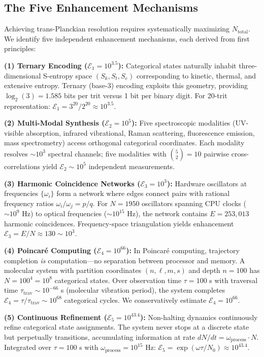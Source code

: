 \documentclass[twocolumn,10pt]{article}
\theoremstyle{remark}
\begin{document}
\subsection{The Five Enhancement Mechanisms}

Achieving trans-Planckian resolution requires systematically maximizing $N_{\text{total}}$. We identify five independent enhancement mechanisms, each derived from first principles:

\textbf{(1) Ternary Encoding ($\mathcal{E}_1 = 10^{3.5}$):}
Categorical states naturally inhabit three-dimensional S-entropy space $(S_k, S_t, S_e)$ corresponding to kinetic, thermal, and extensive entropy. Ternary (base-3) encoding exploits this geometry, providing $\log_2(3) = 1.585$ bits per trit versus 1 bit per binary digit. For 20-trit representation: $\mathcal{E}_1 = 3^{20}/2^{20} \approx 10^{3.5}$.

\textbf{(2) Multi-Modal Synthesis ($\mathcal{E}_2 = 10^{5}$):}
Five spectroscopic modalities (UV-visible absorption, infrared vibrational, Raman scattering, fluorescence emission, mass spectrometry) access orthogonal categorical coordinates. Each modality resolves $\sim 10^3$ spectral channels; five modalities with $\binom{5}{2} = 10$ pairwise cross-correlations yield $\mathcal{E}_2 \sim 10^5$ independent measurements.

\textbf{(3) Harmonic Coincidence Networks ($\mathcal{E}_3 = 10^{3}$):}
Hardware oscillators at frequencies $\{\omega_i\}$ form a network where edges connect pairs with rational frequency ratios $\omega_i/\omega_j = p/q$. For $N = 1950$ oscillators spanning CPU clocks ($\sim 10^9$ Hz) to optical frequencies ($\sim 10^{15}$ Hz), the network contains $E = 253{,}013$ harmonic coincidences. Frequency-space triangulation yields enhancement $\mathcal{E}_3 = E/N \approx 130 \sim 10^3$.

\textbf{(4) Poincaré Computing ($\mathcal{E}_4 = 10^{66}$):}
In Poincaré computing, trajectory completion \textit{is} computation---no separation between processor and memory. A molecular system with partition coordinates $(n, \ell, m, s)$ and depth $n = 100$ has $N = 100^4 = 10^8$ categorical states. Over observation time $\tau = 100$ s with traversal time $\tau_{\text{trav}} \sim 10^{-66}$ s (molecular vibration period), the system completes $\mathcal{E}_4 = \tau/\tau_{\text{trav}} \sim 10^{68}$ categorical cycles. We conservatively estimate $\mathcal{E}_4 = 10^{66}$.

\textbf{(5) Continuous Refinement ($\mathcal{E}_5 = 10^{43.4}$):}
Non-halting dynamics continuously refine categorical state assignments. The system never stops at a discrete state but perpetually transitions, accumulating information at rate $dN/dt = \omega_{\text{process}} \cdot N$. Integrated over $\tau = 100$ s with $\omega_{\text{process}} = 10^{15}$ Hz: $\mathcal{E}_5 = \exp(\omega \tau / N_0) \approx 10^{43.4}$.
\end{document}
